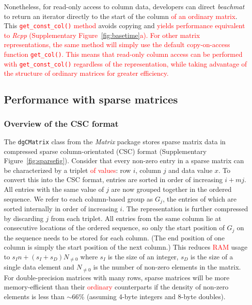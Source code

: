 \documentclass{article}
\newcommand{\beachmat}{\textit{beachmat}}
\newcommand{\code}[1]{\texttt{#1}}
\newcommand{\revised}[1]{\textcolor{red}{#1}}
\begin{document}
Nonetheless, for read-only access to column data, developers can direct \beachmat{} to return an iterator directly to the start of the column \revised{of an ordinary matrix}.
This \revised{\code{get\_const\_col()} method} avoids copying and \revised{yields performance equivalent to \textit{Rcpp} (Supplementary Figure~\ref{fig:basetime}a).
For other matrix representations, the same method will simply use the default copy-on-access function \code{get\_col()}.
This means that read-only column access can be performed with \code{get\_const\_col()} regardless of the representation, while taking advantage of the structure of ordinary matrices for greater efficiency.}

\subsection{Performance with sparse matrices}

\subsubsection{Overview of the CSC format}
The \code{dgCMatrix} class from the \textit{Matrix} package stores sparse matrix data in compressed sparse column-orientated (CSC) format (Supplementary Figure~\ref{fig:sparsefig}).
Consider that every non-zero entry in a sparse matrix can be characterized by a triplet \revised{of values}: row $i$, column $j$ and data value $x$.
To convert this into the CSC format, entries are sorted in order of increasing $i + mj$.
All entries with the same value of $j$ are now grouped together in the ordered sequence.
We refer to each column-based group as $G_j$, the entries of which are sorted internally in order of increasing $i$.
The representation is further compressed by discarding $j$ from each triplet.
All entries from the same column lie at consecutive locations of the ordered sequence, so only the start position of $G_j$ on the sequence needs to be stored for each column.
(The end position of one column is simply the start position of the next column.)
This reduces \revised{RAM} usage to $s_In + (s_I + s_D) N_{\ne 0}$ where $s_I$ is the size of an integer, $s_D$ is the size of a single data element and $N_{\ne 0}$ is the number of non-zero elements in the matrix.
For double-precision matrices with many rows, sparse matrices will be more memory-efficient than their \revised{ordinary} counterparts if the density of non-zero elements is less than $\sim 66$\% (assuming 4-byte integers and 8-byte doubles). 
\end{document}
